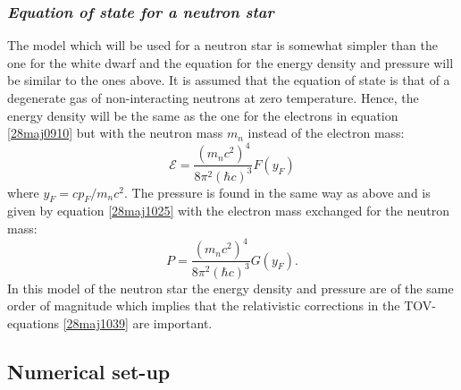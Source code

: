 \documentclass[twocolumn]{article}
\begin{document}
\begin{large}
\subsubsection*{\textit{Equation of state for a neutron star}}
The model which will be used for a neutron star is somewhat simpler than the one for the white dwarf and the equation for the energy density and pressure will be similar to the ones above. It is assumed that the equation of state is that of a degenerate gas of non-interacting neutrons at zero temperature. Hence, the energy density will be the same as the one for the electrons in equation \eqref{28maj0910} but with the neutron mass $m_n$ instead of the electron mass:
\begin{equation}
    \label{28maj1446}
    \mathcal{E} = \frac{(m_nc^2)^4}{8\pi^2(\hbar c)^3}F(y_F)
\end{equation}
where $y_F = cp_F/m_nc^2$. The pressure is found in the same way as above and is given by equation \eqref{28maj1025} with the electron mass exchanged for the neutron mass:
\begin{equation}
    \label{28maj1447}
    P = \frac{(m_nc^2)^4}{8\pi^2(\hbar c)^3}G(y_F).
\end{equation}
In this model of the neutron star the energy density and pressure are of the same order of magnitude which implies that the relativistic corrections in the TOV-equations \eqref{28maj1039} are important. 



\subsection*{Numerical set-up}

\end{large}
\end{document}
